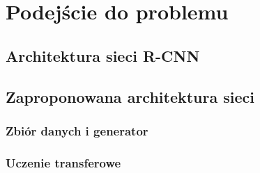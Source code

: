 \chapter{Podejście do problemu}

\section{Architektura sieci R-CNN}

\section{Zaproponowana architektura sieci}

\subsection{Zbiór danych i generator}

\subsection{Uczenie transferowe}
